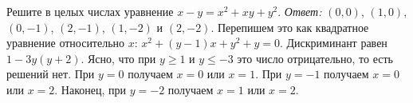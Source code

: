 \problem
Решите в целых числах уравнение $x - y = x^2 + x y + y^2$.
\solution
\emph{Ответ:} $(0, 0)$, $(1, 0)$, $(0, -1)$, $(2, -1)$, $(1, -2)$ и $(2, -2)$.
Перепишем это как квадратное уравнение относительно $x$:
$x^2 + (y - 1) x + y^2 + y = 0$.
Дискриминант равен $1 - 3 y (y + 2)$.
Ясно, что при $y \geq 1$ и $y \leq -3$ это число отрицательно, то есть
решений нет.
При $y = 0$ получаем $x = 0$ или $x = 1$.
При $y = -1$ получаем $x = 0$ или $x = 2$.
Наконец, при $y = -2$ получаем $x = 1$ или $x = 2$.
\endproblem
